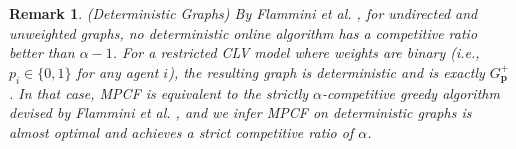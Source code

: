 \documentclass[letterpaper]{article} %
\newtheorem{corollary}{Corollary}
\newtheorem{remark}{Remark}
\begin{document}
\begin{remark}
    \label{remark:competitive analysis}
    {\normalfont (Deterministic Graphs)}
    By Flammini et al. , for undirected and unweighted graphs, no deterministic online algorithm has a competitive ratio better than $\alpha-1$. For a restricted CLV model where weights are binary (i.e., $p_i \in \{0,1\}$ for any agent $i$), the resulting graph is deterministic and is exactly $G^+_{\mathbf{p}}$. In that case, MPCF is equivalent to the strictly $\alpha$-competitive greedy algorithm devised by Flammini et al. , and we infer MPCF on deterministic graphs is almost optimal and achieves a strict competitive ratio of $\alpha$.
\end{remark}

\end{document}
